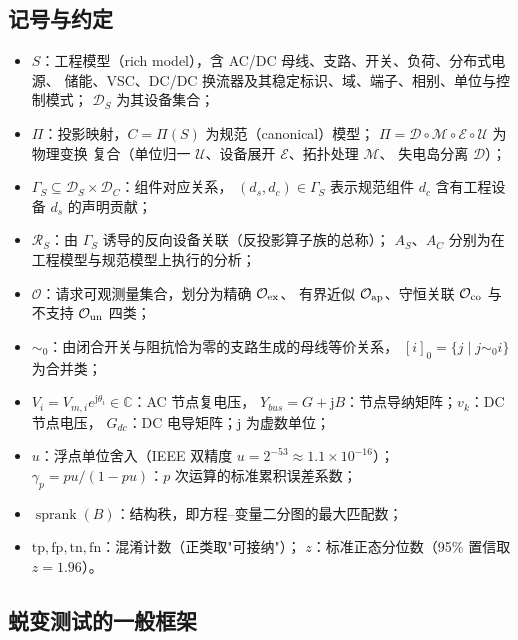 \subsection{记号与约定}\label{sec:sp-th-notation}
\begin{itemize}
  \item $S$：工程模型（rich model），含 AC/DC 母线、支路、开关、负荷、分布式电源、
        储能、VSC、DC/DC 换流器及其稳定标识、域、端子、相别、单位与控制模式；
        $\mathcal D_S$ 为其设备集合；
  \item $\Pi$：投影映射，$C=\Pi(S)$ 为规范（canonical）模型；
        $\Pi=\mathcal D\circ\mathcal M\circ\mathcal E\circ\mathcal U$ 为物理变换
        复合（单位归一 $\mathcal U$、设备展开 $\mathcal E$、拓扑处理 $\mathcal M$、
        失电岛分离 $\mathcal D$）；
  \item $\Gamma_S\subseteq\mathcal D_S\times\mathcal D_C$：组件对应关系，
        $(d_s,d_c)\in\Gamma_S$ 表示规范组件 $d_c$ 含有工程设备 $d_s$ 的声明贡献；
  \item $\mathcal R_S$：由 $\Gamma_S$ 诱导的反向设备关联（反投影算子族的总称）；
        $A_S$、$A_C$ 分别为在工程模型与规范模型上执行的分析；
  \item $\mathcal O$：请求可观测量集合，划分为精确 $\mathcal O_{\rm ex}$、
        有界近似 $\mathcal O_{\rm ap}$、守恒关联 $\mathcal O_{\rm co}$ 与不支持
        $\mathcal O_{\rm un}$ 四类；
  \item $\sim_0$：由闭合开关与阻抗恰为零的支路生成的母线等价关系，
        $[i]_0=\{j\mid j\sim_0 i\}$ 为合并类；
  \item $V_i=V_{m,i}e^{\mathrm j\theta_i}\in\mathbb C$：AC 节点复电压，
        $Y_{bus}=G+\mathrm jB$：节点导纳矩阵；$v_k$：DC 节点电压，
        $G_{dc}$：DC 电导矩阵；$\mathrm j$ 为虚数单位；
  \item $u$：浮点单位舍入（IEEE 双精度 $u=2^{-53}\approx1.1\times10^{-16}$）；
        $\gamma_p=pu/(1-pu)$：$p$ 次运算的标准累积误差系数；
  \item $\operatorname{sprank}(B)$：结构秩，即方程--变量二分图的最大匹配数；
  \item $\mathrm{tp},\mathrm{fp},\mathrm{tn},\mathrm{fn}$：混淆计数（正类取"可接纳"）；
        $z$：标准正态分位数（95\% 置信取 $z=1.96$）。
\end{itemize}

\subsection{蜕变测试的一般框架}\label{sec:sp-th-mt}

